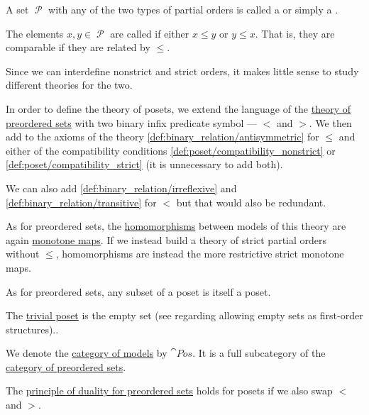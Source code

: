 \begin{definition}
  A set \( \mscrP \) with any of the two types of partial orders is called a  or simply a .

  The elements \( x, y \in \mscrP \) are called  if either \( x \leq y \) or \( y \leq x \). That is, they are comparable if they are related by \( \leq \).

  \begin{thmenum}[resume=def:poset]
     Since we can interdefine nonstrict and strict orders, it makes little sense to study different theories for the two.

    In order to define the theory of posets, we extend the language of the \hyperref[def:preordered_set/theory]{theory of preordered sets} with two binary infix predicate symbol --- \( < \) and \( > \). We then add to the axioms of the theory \eqref{def:binary_relation/antisymmetric} for \( \leq \) and either of the compatibility conditions \eqref{def:poset/compatibility_nonstrict} or \eqref{def:poset/compatibility_strict} (it is unnecessary to add both).

    We can also add \eqref{def:binary_relation/irreflexive} and \eqref{def:binary_relation/transitive} for \( < \) but that would also be redundant.

     As for preordered sets, the \hyperref[def:first_order_homomorphism]{homomorphisms} between models of this theory are again \hyperref[def:preordered_set/homomorphism]{monotone maps}. If we instead build a theory of strict partial orders without \( \leq \), homomorphisms are instead the more restrictive strict monotone maps.

     As for preordered sets, any subset of a poset is itself a poset.

     The \hyperref[thm:substructures_form_complete_lattice/bottom]{trivial poset} is the empty set (see  regarding allowing empty sets as first-order structures)..

     We denote the \hyperref[def:category_of_first_order_models]{category of models} by \( \cat{Pos} \). It is a full subcategory of the \hyperref[def:preordered_set/category]{category of preordered sets}.

     The \hyperref[def:preordered_set/duality]{principle of duality for preordered sets} holds for posets if we also swap \( < \) and \( > \).
  \end{thmenum}
\end{definition}
